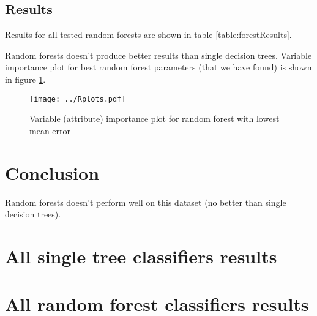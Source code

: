 \documentclass[a4paper]{article}
\begin{document}
\subsection{Results}
\label{singleConc}
Results for all tested random forests are shown in table \ref{table:forestResults}.

Random forests doesn't produce better results than single decision trees.
Variable importance plot for best random forest parameters (that we have found)
is shown in figure \ref{fig:importance}.


\begin{figure}[!hbt]
    \centering
    \texttt{[image: ../Rplots.pdf]}
    \label{fig:importance}
    \caption[]{Variable (attribute) importance plot for random forest with lowest mean error}
\end{figure}


% 
% 
\section{Conclusion}

Random forests doesn't perform well on this dataset (no better than single decision trees).




\onecolumn
\newpage
\appendix
\section{All single tree classifiers results}
% 


\newpage
\section{All random forest classifiers results}
% 

\end{document}
